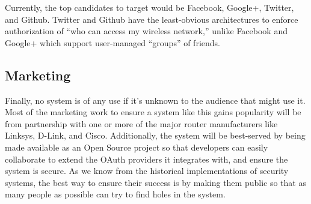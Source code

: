 Currently, the top candidates to target would be Facebook, Google+, Twitter, and Github. Twitter
and Github have the least-obvious architectures to enforce authorization of ``who can access my
wireless network,'' unlike Facebook and Google+ which support user-managed ``groups'' of friends.

\subsection{Marketing}
Finally, no system is of any use if it's unknown to the audience that might use it. Most of the
marketing work to ensure a system like this gains popularity will be from partnership with one or
more of the major router manufacturers like Linksys, D-Link, and Cisco. Additionally, the system
will be best-served by being made available as an Open Source project so that developers can
easily collaborate to extend the OAuth providers it integrates with, and ensure the system is
secure. As we know from the historical implementations of security systems, the best way to ensure
their success is by making them public so that as many people as possible can try to find holes in
the system.